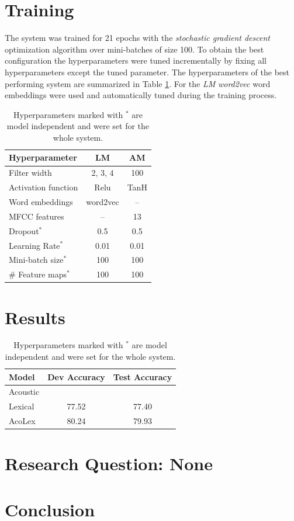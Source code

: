 \documentclass[11pt,a4paper]{article}
\begin{document}
\section{Training}
The system was trained for 21 epochs with the \textit{stochastic gradient descent} optimization algorithm over mini-batches of size 100. To obtain the best configuration the hyperparameters were tuned incrementally by fixing all hyperparameters except the tuned parameter. The hyperparameters of the best performing system are summarized in Table \ref{tab:hyperparameters}. For the \textit{LM} \textit{word2vec} \cite{word2vec} word embeddings were used and automatically tuned during the training process.

\begin{table}[h]
	\centering
	\begin{tabular}{ l | c | c}
		\textbf{Hyperparameter} & \textbf{LM} & \textbf{AM} \\
		\hline
		Filter width & 2, 3, 4 & 100 \\
		Activation function & Relu & TanH \\
		Word embeddings & word2vec & -- \\
		MFCC features & -- & 13 \\
		Dropout$^\ast$ & 0.5 & 0.5 \\
		Learning Rate$^\ast$ & 0.01 & 0.01 \\
		Mini-batch size$^\ast$ & 100 & 100 \\
		\# Feature maps$^\ast$ & 100 & 100 \\
	\end{tabular}
	\caption{Hyperparameters marked with $^\ast$ are model independent and were set for the whole system.}
	\label{tab:hyperparameters}
\end{table}	

\section{Results}

\begin{table}[h]
	\centering
	\begin{tabular}{ l | c c}
		\textbf{Model} & Dev Accuracy & Test Accuracy\\
		\hline
		Acoustic & &  \\
		Lexical & 77.52 & 77.40 \\
		AcoLex & 80.24 & 79.93 \\

	\end{tabular}
	\caption{Hyperparameters marked with $^\ast$ are model independent and were set for the whole system.}
	\label{tab:results}
\end{table}	

\section{Research Question: None}

\section{Conclusion}



\nocite{*}
\end{document}
